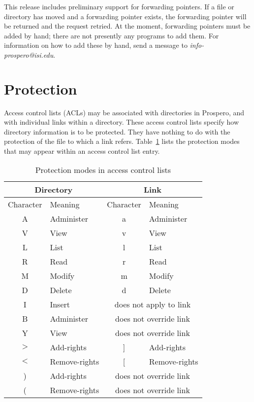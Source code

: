 This release includes preliminary support for forwarding pointers.  If
a file or directory has moved and a forwarding pointer exists, the
forwarding pointer will be returned and the request retried.  At the
moment, forwarding pointers must be added by hand; there are not
presently any programs to add them.  For information on how to add
these by hand, send a message to {\it info-prospero@isi.edu}.

\section{Protection}

Access control lists (ACLs) may be associated with directories in
Prospero, and with individual links within a directory.  These access
control lists specify how directory information is to be protected.
They have nothing to do with the protection of the file to which a
link refers.  Table~\ref{acl_perm_tab_man} lists the protection modes
that may appear within an access control list entry.

\begin{table}
\begin{center}
\caption{Protection modes in access control lists\label{acl_perm_tab_man}}
\begin{tabular}{|c|l||c|l|}\hline
\multicolumn{2}{|c||}{Directory} & \multicolumn{2}{|c|}{Link}  \\ \hline
Character & Meaning & Character & Meaning \\ \hline \hline
A & Administer & a & Administer \\ \hline
V & View & v & View \\ \hline
L & List & l & List \\ \hline
R & Read & r & Read \\ \hline
M & Modify & m & Modify \\ \hline
D & Delete & d & Delete \\ \hline
I & Insert & \multicolumn{2}{|c|}{does not apply to link} \\ \hline 
B & Administer & \multicolumn{2}{|c|}{does not override link} \\ \hline
Y & View & \multicolumn{2}{|c|}{does not override link} \\ \hline
\( > \) & Add-rights  & ] & Add-rights \\ \hline
\( < \) & Remove-rights & [ & Remove-rights \\ \hline
) & Add-rights & \multicolumn{2}{|c|}{does not override link} \\ \hline
( & Remove-rights & \multicolumn{2}{|c|}{does not override link} \\ \hline
\end{tabular}
\end{center}
\end{table}

